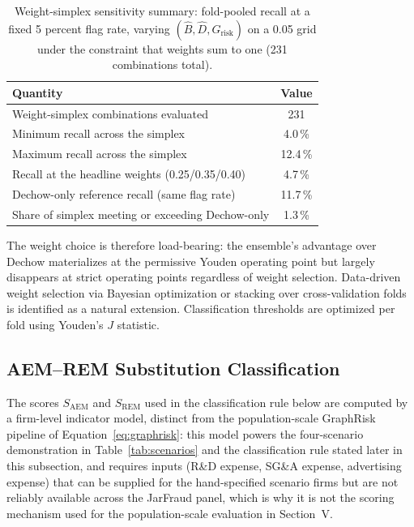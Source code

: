 \documentclass[12pt]{article}
\begin{document}
\begin{table}[tbp]
\centering
\caption{Weight-simplex sensitivity summary: fold-pooled recall at a fixed
         5 percent flag rate, varying $(\hat{B}, \hat{D}, G_{\text{risk}})$ on a 0.05 grid
         under the constraint that weights sum to one (231 combinations
         total).}
\label{tab:sensitivity}
\small
\begin{tabular}{lc}
\toprule
\textbf{Quantity} & \textbf{Value} \\
\midrule
Weight-simplex combinations evaluated              & 231       \\
Minimum recall across the simplex                  & 4.0\,\%   \\
Maximum recall across the simplex                  & 12.4\,\%  \\
Recall at the headline weights (0.25/0.35/0.40)    & 4.7\,\%   \\
Dechow-only reference recall (same flag rate)      & 11.7\,\%  \\
Share of simplex meeting or exceeding Dechow-only  & 1.3\,\%   \\
\bottomrule
\end{tabular}
\end{table}

The weight choice is therefore load-bearing: the ensemble's advantage
over Dechow materializes at the permissive Youden operating point but
largely disappears at strict operating points regardless of weight
selection.
Data-driven weight selection via Bayesian optimization or stacking over
cross-validation folds is identified as a natural extension.
Classification thresholds are optimized per fold using Youden's $J$
statistic.

\subsection*{AEM--REM Substitution Classification}
\label{subsec:subst}

The scores $S_{\text{AEM}}$ and $S_{\text{REM}}$ used in the classification
rule below are computed by a firm-level indicator model, distinct from the
population-scale GraphRisk pipeline of Equation~\eqref{eq:graphrisk}: this
model powers the four-scenario demonstration in Table~\ref{tab:scenarios}
and the classification rule stated later in this subsection, and requires
inputs (R\&D expense, SG\&A expense, advertising expense) that can be
supplied for the hand-specified scenario firms but are not reliably
available across the JarFraud panel, which is why it is not the scoring
mechanism used for the population-scale evaluation in Section~V.
\end{document}
